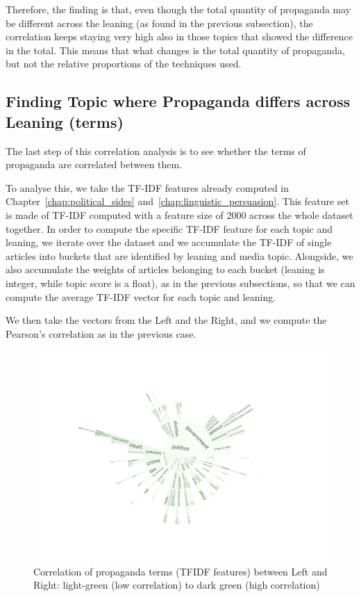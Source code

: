 Therefore, the finding is that, even though the total quantity of propaganda may be different across the leaning (as found in the previous subsection), the correlation keeps staying very high also in those topics that showed the difference in the total.
This means that what changes is the total quantity of propaganda, but not the relative proportions of the techniques used.

\subsection{\statusorange Finding Topic where Propaganda differs across Leaning (terms)}
\label{ssec:topic_propaganda_leaning_terms}

The last step of this correlation analysis is to see whether the terms of propaganda are correlated between them.

To analyse this, we take the TF-IDF features already computed in Chapter~\ref{chap:political_sides} and~\ref{chap:linguistic_persuasion}.
This feature set is made of TF-IDF computed with a feature size of 2000 across the whole dataset together.
In order to compute the specific TF-IDF feature for each topic and leaning, we iterate over the dataset and we accumulate the TF-IDF of single articles into buckets that are identified by leaning and media topic.
Alongside, we also accumulate the weights of articles belonging to each bucket (leaning is integer, while topic score is a float), as in the previous subsections, so that we can compute the average TF-IDF vector for each topic and leaning.

We then take the vectors from the Left and the Right, and we compute the Pearson's correlation as in the previous case.

\begin{figure}[!htbp]
    \centering
    \includegraphics[trim={2.2cm 2cm 2.2cm 2cm},clip,width=\linewidth]{figures/baly_iptc_weighted_prop_leaning_corr_tfidf.pdf}
    \caption{Correlation of propaganda terms (TFIDF features) between Left and Right: light-green (low correlation) to dark green (high correlation)}
    \label{fig:baly_iptc_weighted_prop_leaning_corr_tfidf}
\end{figure}

